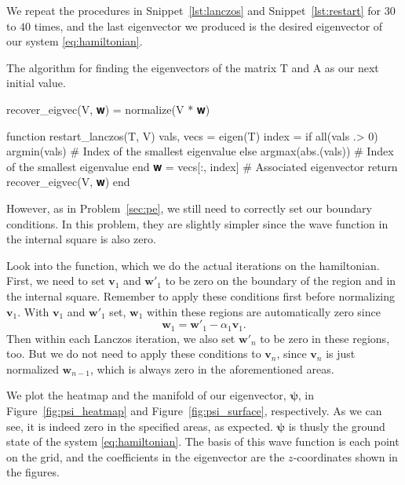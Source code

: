 We repeat the procedures in Snippet~\ref{lst:lanczos} and Snippet~\ref{lst:restart}
for \(30\) to \(40\) times, and the last eigenvector we produced is the desired eigenvector
of our system \eqref{eq:hamiltonian}.

\begin{algorithm}[!hbt]
    \caption{The algorithm for finding the eigenvectors of the matrix \(\mathrm{T}\)
        and \(\mathrm{A}\) as our next initial value.}
    \label{lst:restart}
    \begin{juliacode}
recover_eigvec(V, 𝐰) = normalize(V * 𝐰)

function restart_lanczos(T, V)
    vals, vecs = eigen(T)
    index = if all(vals .> 0)
        argmin(vals)  # Index of the smallest eigenvalue
    else
        argmax(abs.(vals))  # Index of the smallest eigenvalue
    end
    𝐰 = vecs[:, index]  # Associated eigenvector
    return recover_eigvec(V, 𝐰)
end
    \end{juliacode}
\end{algorithm}

However, as in Problem~\ref{sec:pe}, we still need to correctly set our boundary
conditions. In this problem, they are slightly simpler since the wave function
in the internal square is also zero.

Look into the  function, which we do the actual iterations on
the hamiltonian.
First, we need to set \(\bm{v}_1\) and \(\bm{w}'_1\) to be zero on the boundary of the region
and in the internal square. Remember to apply these conditions first before
normalizing \(\bm{v}_1\). With \(\bm{v}_1\) and \(\bm{w}'_1\) set, \(\bm{w}_1\) within these
regions are automatically zero since
%
\begin{equation}
    \bm{w}_1 = \bm{w}'_1 - \alpha_1 \bm{v}_1.
\end{equation}
%
Then within each Lanczos iteration, we also set \(\bm{w}'_n\) to be zero in these regions,
too. But we do not need to apply these conditions to \(\bm{v}_n\),
since \(\bm{v}_n\) is just normalized \(\bm{w}_{n-1}\), which is always zero
in the aforementioned areas.

We plot the heatmap and the manifold of our eigenvector, \(\bm{\psi}\), in
Figure~\ref{fig:psi_heatmap} and Figure~\ref{fig:psi_surface}, respectively.
As we can see, it is indeed zero in the specified areas, as expected.
\(\bm{\psi}\) is thusly the ground state of the system \eqref{eq:hamiltonian}.
The basis of this wave function is each point on the grid, and the coefficients
in the eigenvector are the \(z\)-coordinates shown in the figures.


